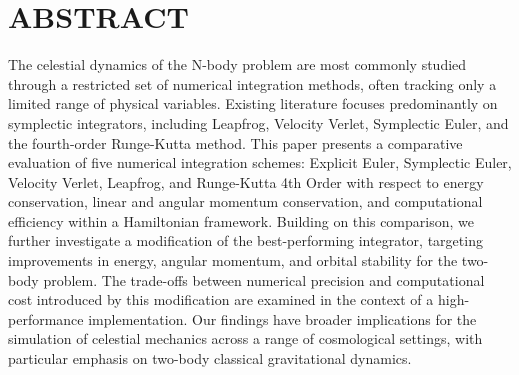\section{ABSTRACT}

The celestial dynamics of the N-body problem are most commonly studied through a restricted set of numerical integration methods, often tracking only a limited range of physical variables.
Existing literature focuses predominantly on symplectic integrators, including Leapfrog, Velocity Verlet, Symplectic Euler, and the fourth-order Runge-Kutta method.
This paper presents a comparative evaluation of five numerical integration schemes: Explicit Euler, Symplectic Euler, Velocity Verlet, Leapfrog, and Runge-Kutta 4th Order with respect to energy conservation, linear and angular momentum conservation, and computational efficiency within a Hamiltonian framework.
Building on this comparison, we further investigate a modification of the best-performing integrator, targeting improvements in energy, angular momentum, and orbital stability for the two-body problem.
The trade-offs between numerical precision and computational cost introduced by this modification are examined in the context of a high-performance implementation.
Our findings have broader implications for the simulation of celestial mechanics across a range of cosmological settings, with particular emphasis on two-body classical gravitational dynamics.